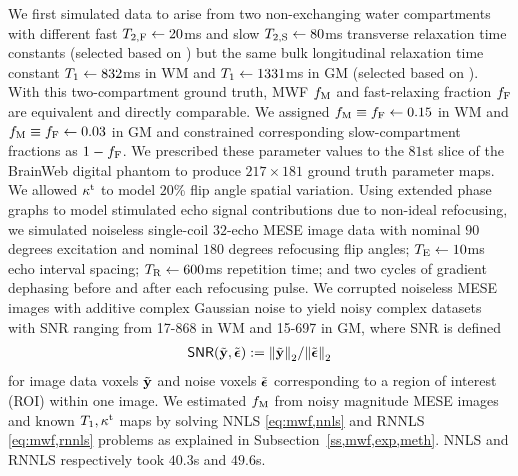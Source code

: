 We first simulated data 
to arise from two non-exchanging water compartments
with different fast $T_{2,\mathrm{F}} \gets 20$ms
and slow $T_{2,\mathrm{S}} \gets 80$ms
transverse relaxation time constants
(selected based on \cite{mackay:94:ivv,deoni:11:com})
but the same bulk longitudinal relaxation time constant
$T_1 \gets 832$ms in WM
and $T_1 \gets 1331$ms in GM
(selected based on \cite{wansapura:99:nrt}).
With this two-compartment ground truth, 
MWF $f_\mathrm{M}$ and fast-relaxing fraction $f_{\mathrm{F}}$
are equivalent and directly comparable.
We assigned 
$f_\mathrm{M} \equiv f_{\mathrm{F}} \gets 0.15$ in WM
and 
$f_\mathrm{M} \equiv f_{\mathrm{F}} \gets 0.03$ in GM
and constrained corresponding slow-compartment fractions
as $1-f_{\mathrm{F}}$.
We prescribed these parameter values
to the $81$st slice
of the BrainWeb digital phantom \cite{collins:98:dac}
to produce $217 \times 181$ ground truth parameter maps.
We allowed $\kappa^{\mathrm{t}}$ to model $20$\% flip angle spatial variation.
Using extended phase graphs 
to model stimulated echo signal contributions
due to non-ideal refocusing,
we simulated noiseless single-coil $32$-echo MESE image data
with nominal $90$ degrees excitation 
and nominal $180$ degrees refocusing flip angles;
$T_\mathrm{E} \gets 10$ms echo interval spacing; 
$T_\mathrm{R} \gets 600$ms repetition time;
and two cycles of gradient dephasing 
before and after each refocusing pulse.
We corrupted noiseless MESE images
with additive complex Gaussian noise
to yield noisy complex datasets
with SNR ranging 
from 17-868 in WM
and 15-697 in GM,
where SNR is defined
\begin{align}
	\snr{\bmyt,\bmepst} := \norm{\bmyt}_2/\norm{\bmepst}_2
  \label{eq:mwf,snr}
\end{align}
for image data voxels $\tilde{\mathbf{y}}$ and noise voxels $\tilde{\boldsymbol{\epsilon}}$
corresponding to a region of interest (ROI)
within one image.
We estimated $f_\mathrm{M}$ 
from noisy magnitude MESE images
and known $T_1,\kappa^{\mathrm{t}}$ maps
by solving NNLS \eqref{eq:mwf,nnls}
and RNNLS \eqref{eq:mwf,rnnls} problems
as explained in Subsection~\ref{ss,mwf,exp,meth}.
NNLS and RNNLS respectively took $40.3$s and $49.6$s.


